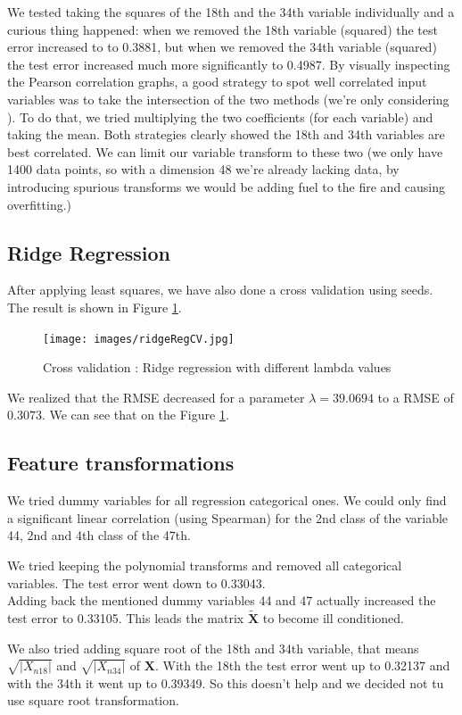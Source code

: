 \documentclass{article} %
\begin{document}
We tested taking the squares of the 18th and the 34th variable individually and a curious thing happened: when we removed the 18th variable (squared) the test error increased to to 0.3881, but when we removed the 34th variable (squared) the test error increased much more significantly to 0.4987.
\label{sec:regridgreg}
By visually inspecting the Pearson correlation graphs, a good strategy to spot well correlated input variables was to take the intersection of the two methods (we’re only considering ). To do that, we tried multiplying the two coefficients (for each variable) and taking the mean. Both strategies clearly showed the 18th and 34th variables are best correlated. We can limit our variable transform to these two (we only have 1400 data points, so with a dimension 48 we’re already lacking data, by introducing spurious transforms we would be adding fuel to the fire and causing overfitting.)

\subsection{Ridge Regression}
After applying least squares, we have also done a cross validation using seeds. The result is shown in Figure \ref{fig:ridreggcv}.
\begin{figure}
\centering
\texttt{[image: images/ridgeRegCV.jpg]}
\caption{Cross validation : Ridge regression with different lambda values }
\label{fig:ridreggcv}
\end{figure}
We realized that the RMSE decreased for a parameter $\lambda = 39.0694$ to a RMSE of $0.3073$. We can see that on the Figure \ref{fig:ridreggcv}.

\subsection{Feature transformations}
We tried dummy variables for all regression categorical ones. We could only find a significant linear correlation (using Spearman) for the 2nd class of the variable 44, 2nd and 4th class of the 47th.

We tried keeping the polynomial transforms and removed all categorical variables. The test error went down to 0.33043.\\

Adding back the mentioned dummy variables 44 and 47 actually increased the test error to 0.33105. This leads the matrix $\mathbf{\tilde{X}}$ to become ill conditioned.

We also tried adding square root of the 18th and 34th variable, that means $\sqrt{|X_{n18}|}$ and $\sqrt{|X_{n34}|}$ of $\mathbf{X}$. With the 18th the test error went up to 0.32137 and with the 34th it went up to 0.39349. So this doesn't help and we decided not tu use square root transformation.
\end{document}
